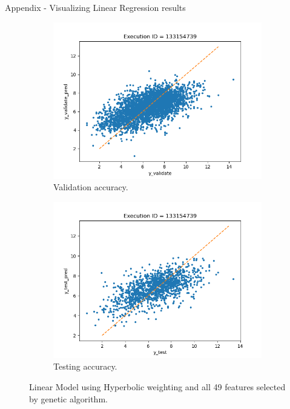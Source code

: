\documentclass{beamer}
\begin{document}
\begin{frame}[t]{Appendix - Visualizing Linear Regression results}
\begin{figure}
     \centering
     \begin{subfigure}[b]{0.45\textwidth}
         \centering
         \includegraphics[scale=0.35]{images/accuracyValidateLGHyperbolic}
         \caption{Validation accuracy.}
        \label{fig:accuracyValidateLGHyperbolic}
     \end{subfigure}
     \hfill
     \begin{subfigure}[b]{0.45\textwidth}
         \centering
         \includegraphics[scale=0.35]{images/accuracytestLGHyperbolic}
        \caption{Testing accuracy.}
        \label{fig:accuracytestLGHyperbolic}
     \end{subfigure}
     \caption{Linear Model using Hyperbolic weighting and all 49 features selected by genetic algorithm.}
     \label{fig:BestLinearModel}
\end{figure}
\end{frame}
\end{document}

